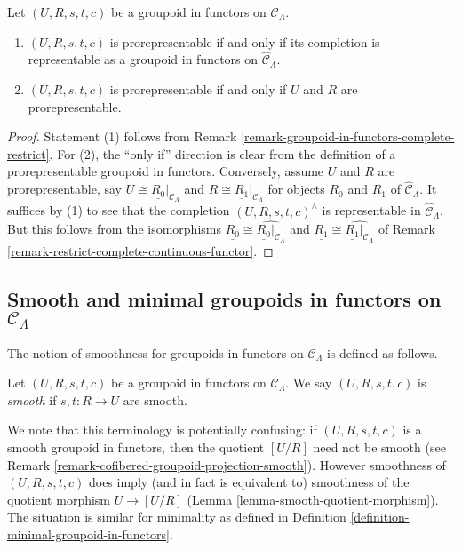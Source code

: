 \begin{lemma}
\label{lemma-groupoid-in-functors-prorep-equivalences}
Let $(U,R,s,t,c)$ be a groupoid in functors on $\mathcal C_{\Lambda}$.
\begin{enumerate}
\item $(U,R,s,t,c)$ is prorepresentable if and only if its completion is 
representable as a groupoid in functors on $\widehat{\mathcal C}_{\Lambda}$.
\item $(U,R,s,t,c)$ is prorepresentable if and only if $U$ and $R$ are 
prorepresentable.
\end{enumerate}
\end{lemma}

\begin{proof}
Statement (1) follows from Remark 
\ref{remark-groupoid-in-functors-complete-restrict}. For (2), the ``only if'' 
direction is clear from the definition of a prorepresentable groupoid in 
functors. Conversely, assume $U$ and $R$ are prorepresentable, say $U \cong 
\underline{R_0}|_{\mathcal C_{\Lambda}}$ and $R \cong 
\underline{R_1}|_{\mathcal C_{\Lambda}}$ for objects $R_0$ and $R_1$ of 
$\widehat{\mathcal C}_{\Lambda}$. It suffices by (1) to see that the completion 
$(U,R,s,t,c)^{\wedge}$ is representable in $\widehat{\mathcal C}_{\Lambda}$.  
But this follows from the isomorphisms $\underline{R_0} \cong 
\widehat{\underline{R_0}|_{\mathcal C_{\Lambda}}}$ and $\underline{R_1} \cong 
\widehat{\underline{R_1}|_{\mathcal C_{\Lambda}}}$ of Remark 
\ref{remark-restrict-complete-continuous-functor}.
\end{proof}

\subsection{Smooth and minimal groupoids in functors on $\mathcal C_{\Lambda}$}
\label{subsection-smooth-minimal-groupoids-in-functors}

\noindent
The notion of smoothness for groupoids in functors on $\mathcal C_{\Lambda}$ is 
defined as follows.

\begin{definition}
\label{definition-smooth-groupoid-in-functors}
Let $(U, R, s,t,c)$ be a groupoid in functors on $\mathcal C_{\Lambda}$.  We 
say $(U, R, s,t,c)$ is {\it smooth} if $s,t: R \rightarrow U$ are smooth.
\end{definition}

\begin{remark}
\label{remark-smooth-groupoid-in-functors-warning}
We note that this terminology is potentially confusing: if $(U, R, s,t,c)$ is a 
smooth groupoid in functors, then the quotient $[U/R]$ need not be smooth (see 
Remark \ref{remark-cofibered-groupoid-projection-smooth}).  However smoothness 
of $(U, R, s,t,c)$ does imply (and in fact is equivalent to) smoothness of the 
quotient morphism $U \rightarrow [U/R]$ (Lemma 
\ref{lemma-smooth-quotient-morphism}).  The situation is similar for minimality 
as defined in Definition \ref{definition-minimal-groupoid-in-functors}.
\end{remark}

